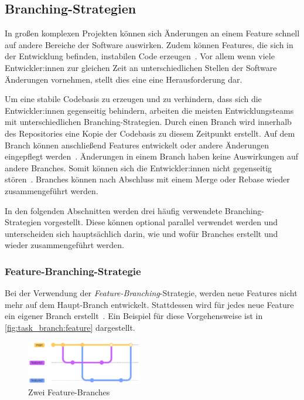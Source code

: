 
\subsection{Branching-Strategien}
\label{sec:workflows:task}

In großen komplexen Projekten können sich Änderungen an einem Feature schnell auf andere Bereiche der Software auswirken. Zudem können Features, die sich in der Entwicklung befinden, instabilen Code erzeugen~\cite{sorin_dumitrescu_what_2021}. Vor allem wenn viele Entwickler:innen zur gleichen Zeit an unterschiedlichen Stellen der Software Änderungen vornehmen, stellt dies eine eine Herausforderung dar.

Um eine stabile Codebasis zu erzeugen und zu verhindern, dass sich die Entwickler:innen gegenseitig behindern, arbeiten die meisten Entwicklungsteams mit unterschiedlichen Branching\hyp Strategien. Durch einen Branch wird innerhalb des Repositories eine Kopie der Codebasis zu diesem Zeitpunkt erstellt. Auf dem Branch können anschließend Features entwickelt oder andere Änderungen eingepflegt werden~\cite{atlassian_hintergrundwissen_2023}. Änderungen in einem Branch haben keine Auswirkungen auf andere Branches. Somit können sich die Entwickler:innen nicht gegenseitig stören~\cite{atlassian_hintergrundwissen_2023}. Branches können nach Abschluss mit einem Merge oder Rebase wieder zusammengeführt werden.

In den folgenden Abschnitten werden drei häufig verwendete Branching\hyp Strategien vorgestellt. Diese können optional parallel verwendet werden und unterscheiden sich hauptsächlich darin, wie und wofür Branches erstellt und wieder zusammengeführt werden.


\subsubsection{Feature\hyp Branching\hyp Strategie}

Bei der Verwendung der \emph{Feature\hyp Branching}\hyp Strategie, werden neue Features nicht mehr auf dem Haupt\hyp Branch entwickelt. Stattdessen wird für jedes neue Feature ein eigener Branch erstellt~\cite{atlassian_feature_2023}. Ein Beispiel für diese Vorgehensweise ist in \autoref{fig:task_branch:feature} dargestellt.

\begin{figure}
    \includegraphics[width=0.45\textwidth]{src/assets/diagrams/task_branch/feature-branch.pdf}
    \caption{Zwei Feature\hyp Branches}
    \label{fig:task_branch:feature}
\end{figure}

